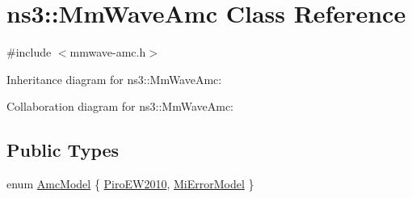 \hypertarget{classns3_1_1MmWaveAmc}{}\section{ns3\+:\+:Mm\+Wave\+Amc Class Reference}
\label{classns3_1_1MmWaveAmc}


{\ttfamily \#include $<$mmwave-\/amc.\+h$>$}



Inheritance diagram for ns3\+:\+:Mm\+Wave\+Amc\+:


Collaboration diagram for ns3\+:\+:Mm\+Wave\+Amc\+:
\subsection*{Public Types}
\begin{DoxyCompactItemize}
\item 
enum \hyperlink{classns3_1_1MmWaveAmc_a2805c1e6b48cb88e9cf86b062e079401}{Amc\+Model} \{ \hyperlink{classns3_1_1MmWaveAmc_a2805c1e6b48cb88e9cf86b062e079401aa7b0954f22ca97fa89b0d794155245d0}{Piro\+E\+W2010}, 
\hyperlink{classns3_1_1MmWaveAmc_a2805c1e6b48cb88e9cf86b062e079401ac8de076cfbfb1280afab7b9590e00151}{Mi\+Error\+Model}
 \}
\end{DoxyCompactItemize}
